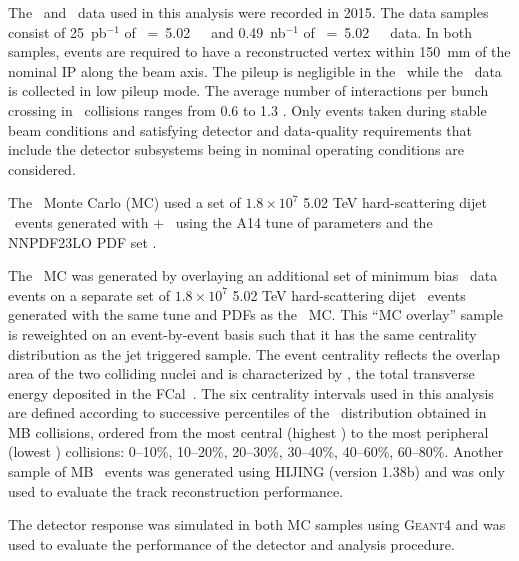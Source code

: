 
The \PbPb\ and \pp\ data used in this analysis were recorded in 2015.
The data samples consist of 25~pb$^{-1}$ of \sqrts~=~5.02~\TeV\ \pp\ and 0.49~nb$^{-1}$ of \sqrtsnn~=~5.02~\TeV\ \pbpb\ data.
In both samples, events are required to have a reconstructed vertex within 150~mm of the nominal IP along the beam axis.
The pileup is negligible in the \pbpb\ while the \pp\ data is collected in low pileup mode.
The average number of interactions per bunch crossing in \pp\ collisions ranges from 0.6 to 1.3 \cite{Aaboud:2017tke}.
Only events taken during stable beam conditions and satisfying detector and data-quality requirements that include the detector subsystems being in nominal operating conditions are considered.

The \pp\ Monte Carlo (MC) used a set of $1.8\times10^7$ 5.02 TeV hard-scattering dijet \pp\ events generated with \powheg{}+\pythiaeight\ \cite{Nason:2004rx,Sjostrand:2014zea} using the A14 tune of parameters \cite{ATLAS2014021} and the NNPDF23LO PDF set \cite{Ball:2012cx}.

The \pbpb\ MC was generated by overlaying an additional set of minimum bias \pbpb\ data events on a separate set of $1.8\times10^7$ 5.02 TeV hard-scattering dijet \pp\ events generated with the same tune and PDFs as the \pp\ MC.
This ``MC overlay'' sample is reweighted on an event-by-event basis such that it has the same centrality distribution as the jet triggered sample.
The event centrality reflects the overlap area of the two colliding nuclei and is characterized by \ETfcal, the total transverse energy deposited in the FCal~\cite{Aaboud:2017tql}.
The six centrality intervals used in this analysis are defined according to successive percentiles of the \ETfcal\ distribution obtained in MB collisions, ordered from the most central (highest \ETfcal) to the most peripheral (lowest \ETfcal) collisions: 0--10\%, 10--20\%, 20--30\%, 30--40\%, 40--60\%, 60--80\%.
Another sample of MB \pbpb\ events was generated using HIJING (version 1.38b) \cite{Wang:1991hta} and was only used to evaluate the track reconstruction performance.

The detector response was simulated in both MC samples using \textsc{Geant4} \cite{Agostinelli:2002hh,Aad:2010ah} and was used to evaluate the performance of the detector and analysis procedure.



